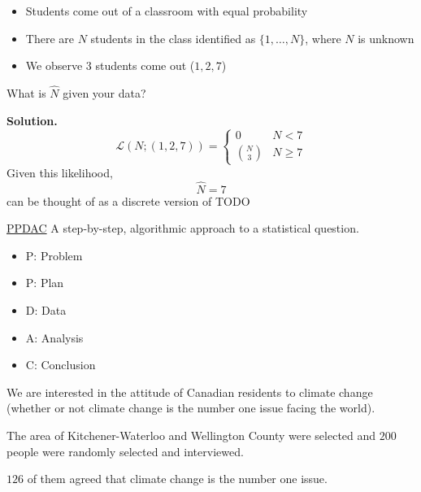 \begin{Example}{}{}
    \begin{itemize}
        \item Students come out of a classroom with equal probability
        \item There are $ N $ students in the class identified as $ \{1,\ldots ,N\} $, where
              $ N $ is unknown
        \item We observe $ 3 $ students come out ($ 1,2,7 $)
    \end{itemize}
    What is $ \hat{N} $ given your data?

    \textbf{Solution.}
    \[ \mathcal{L}(N;(1,2,7))=
        \begin{cases}
            0            & N<7          \\
            \binom{N}{3} & N\geqslant 7
        \end{cases} \]
    Given this likelihood,
    \[ \hat{N}=7 \]
    can be thought of as a discrete version of TODO
\end{Example}


\underline{PPDAC}
A step-by-step, algorithmic approach to a statistical question.
\begin{itemize}
    \item P\@: Problem
    \item P\@: Plan
    \item D\@: Data
    \item A\@: Analysis
    \item C\@: Conclusion
\end{itemize}

\begin{Example}{}{}
    We are interested in the attitude of Canadian residents to climate change
    (whether or not climate change is the number one issue facing the world).

    The area of Kitchener-Waterloo and Wellington County were selected
    and $ 200 $ people were randomly selected and interviewed.

    $ 126 $ of them agreed that climate change is the number one issue.
\end{Example}

